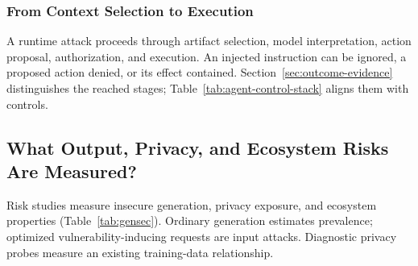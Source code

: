 \documentclass[acmsmall,screen,review,nonacm]{acmart}
\begin{document}
\subsubsection{From Context Selection to Execution}
A runtime attack proceeds through artifact selection, model interpretation, action proposal, authorization, and execution. An injected instruction can be ignored, a proposed action denied, or its effect contained. Section~\ref{sec:outcome-evidence} distinguishes the reached stages; Table~\ref{tab:agent-control-stack} aligns them with controls.

\subsection{What Output, Privacy, and Ecosystem Risks Are Measured?}
\label{sec:gensec}

Risk studies measure insecure generation, privacy exposure, and ecosystem properties (Table~\ref{tab:gensec}). Ordinary generation estimates prevalence; optimized vulnerability-inducing requests are input attacks. Diagnostic privacy probes measure an existing training-data relationship.
\end{document}
